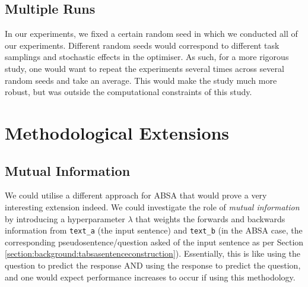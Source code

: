 \subsection{Multiple Runs}
In our experiments, we fixed a certain random seed in which we conducted all of our experiments. Different random seeds would correspond to different task samplings and stochastic effects in the optimiser. As such, for a more rigorous study, one would want to repeat the experiments several times across several random seeds and take an average. This would make the study much more robust, but was outside the computational constraints of this study.

\section{Methodological Extensions}
\subsection{Mutual Information}
We could utilise a different approach for ABSA that would prove a very interesting extension indeed. We could investigate the role of \textit{mutual information} by introducing a hyperparameter $\lambda$ that weights the forwards and backwards information from \texttt{text\_a} (the input sentence) and \texttt{text\_b} (in the ABSA case, the corresponding pseudosentence/question asked of the input sentence as per Section \ref{section:background:tabsasentenceconstruction}). Essentially, this is like using the question to predict the response AND using the response to predict the question, and one would expect performance increases to occur if using this methodology.

